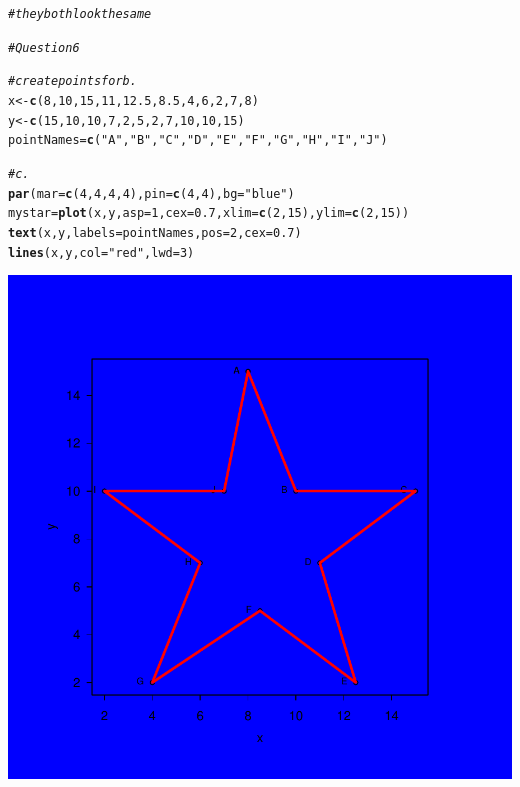 \documentclass{article}\usepackage[]{graphicx}\usepackage[]{xcolor}
\makeatletter
\newcommand{\hlnum}[1]{\textcolor[rgb]{0.686,0.059,0.569}{#1}}%
\newcommand{\hlstr}[1]{\textcolor[rgb]{0.192,0.494,0.8}{#1}}%
\newcommand{\hlcom}[1]{\textcolor[rgb]{0.678,0.584,0.686}{\textit{#1}}}%
\newcommand{\hlstd}[1]{\textcolor[rgb]{0.345,0.345,0.345}{#1}}%
\newcommand{\hlkwb}[1]{\textcolor[rgb]{0.69,0.353,0.396}{#1}}%
\newcommand{\hlkwc}[1]{\textcolor[rgb]{0.333,0.667,0.333}{#1}}%
\newcommand{\hlkwd}[1]{\textcolor[rgb]{0.737,0.353,0.396}{\textbf{#1}}}%
\newenvironment{kframe}{%
 \def\at@end@of@kframe{}%
 \ifinner\ifhmode%
  \def\at@end@of@kframe{\end{minipage}}%
  \begin{minipage}{\columnwidth}%
 \fi\fi%
 \def\FrameCommand##1{\hskip\@totalleftmargin \hskip-\fboxsep
 \colorbox{shadecolor}{##1}\hskip-\fboxsep
     \hskip-\linewidth \hskip-\@totalleftmargin \hskip\columnwidth}%
 \MakeFramed {\advance\hsize-\width
   \@totalleftmargin\z@ \linewidth\hsize
   \@setminipage}}%
 {\par\unskip\endMakeFramed%
 \at@end@of@kframe}
\newenvironment{knitrout}{}{} %
\makeatother
\begin{document}
\begin{knitrout}
{}


\begin{kframe}\begin{alltt}
\hlcom{# they both look the same}

\hlcom{#Question 6}

\hlcom{# create points for b.}
\hlstd{x} \hlkwb{<-} \hlkwd{c}\hlstd{(}\hlnum{8}\hlstd{,} \hlnum{10}\hlstd{,} \hlnum{15}\hlstd{,} \hlnum{11}\hlstd{,} \hlnum{12.5}\hlstd{,} \hlnum{8.5}\hlstd{,} \hlnum{4}\hlstd{,} \hlnum{6}\hlstd{,} \hlnum{2}\hlstd{,} \hlnum{7}\hlstd{,} \hlnum{8}\hlstd{)}
\hlstd{y} \hlkwb{<-} \hlkwd{c}\hlstd{(}\hlnum{15}\hlstd{,} \hlnum{10}\hlstd{,} \hlnum{10}\hlstd{,} \hlnum{7}\hlstd{,} \hlnum{2}\hlstd{,} \hlnum{5}\hlstd{,} \hlnum{2}\hlstd{,} \hlnum{7}\hlstd{,} \hlnum{10}\hlstd{,} \hlnum{10}\hlstd{,} \hlnum{15}\hlstd{)}
\hlstd{pointNames} \hlkwb{=} \hlkwd{c}\hlstd{(}\hlstr{"A"}\hlstd{,}\hlstr{"B"}\hlstd{,}\hlstr{"C"}\hlstd{,}\hlstr{"D"}\hlstd{,}\hlstr{"E"}\hlstd{,}\hlstr{"F"}\hlstd{,}\hlstr{"G"}\hlstd{,}\hlstr{"H"}\hlstd{,}\hlstr{"I"}\hlstd{,}\hlstr{"J"}\hlstd{)}

\hlcom{# c.}
\hlkwd{par}\hlstd{(}\hlkwc{mar} \hlstd{=} \hlkwd{c}\hlstd{(}\hlnum{4}\hlstd{,} \hlnum{4}\hlstd{,} \hlnum{4}\hlstd{,} \hlnum{4}\hlstd{),} \hlkwc{pin} \hlstd{=} \hlkwd{c}\hlstd{(}\hlnum{4}\hlstd{,} \hlnum{4}\hlstd{),}\hlkwc{bg}\hlstd{=}\hlstr{"blue"}\hlstd{)}
\hlstd{mystar} \hlkwb{=} \hlkwd{plot}\hlstd{(x,y,} \hlkwc{asp} \hlstd{=} \hlnum{1}\hlstd{,} \hlkwc{cex} \hlstd{=} \hlnum{0.7}\hlstd{,} \hlkwc{xlim} \hlstd{=}\hlkwd{c}\hlstd{(}\hlnum{2}\hlstd{,}\hlnum{15}\hlstd{),} \hlkwc{ylim} \hlstd{=} \hlkwd{c}\hlstd{(}\hlnum{2}\hlstd{,}\hlnum{15}\hlstd{))}
\hlkwd{text}\hlstd{(x,y,}\hlkwc{labels} \hlstd{= pointNames,}\hlkwc{pos}\hlstd{=}\hlnum{2}\hlstd{,}\hlkwc{cex} \hlstd{=} \hlnum{0.7}\hlstd{)}
\hlkwd{lines}\hlstd{(x,y,} \hlkwc{col} \hlstd{=} \hlstr{"red"}\hlstd{,}\hlkwc{lwd} \hlstd{=} \hlnum{3}\hlstd{)}
\end{alltt}
\end{kframe}

{\centering \includegraphics[width=.6\linewidth]{figure/Meng51940633A3-Rnwauto-report-7} 

}
\end{knitrout}
\end{document}
